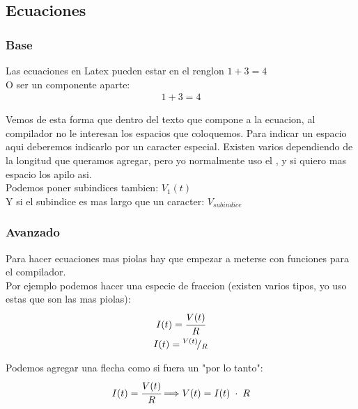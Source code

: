 \documentclass[a4paper,12pt]{article}
\newcommand*\rfrac[2]{{}^{#1}\!/_{#2}}
\begin{document}
    \newpage
    \subsection{Ecuaciones}

        \subsubsection{Base}

            Las ecuaciones en Latex pueden estar en el renglon $1 + 3 = 4$ \\
            O ser un componente aparte:
            \begin{gather*}
                1 +       3 = 4
            \end{gather*}

            Vemos de esta forma que dentro del texto que compone a la ecuacion, al compilador no le interesan los espacios que coloquemos.
            Para indicar un espacio aqui deberemos indicarlo por un caracter especial. Existen varios dependiendo de la longitud que queramos
            agregar, pero yo normalmente uso el \;, y si quiero mas espacio los apilo \;\;\;\;\; asi. \\
            
            Podemos poner subindices tambien: $V_1(t)$ \\
            Y si el subindice es mas largo que un caracter: $V_{subindice}$ \\

        \subsubsection{Avanzado}

            Para hacer ecuaciones mas piolas hay que empezar a meterse con funciones para el compilador. \\
            Por ejemplo podemos hacer una especie de fraccion (existen varios tipos, yo uso estas que son las mas piolas):
            \begin{gather*}
                I(t) = \cfrac{V(t)}{R} \\
                I(t) = \rfrac{V(t)}{R}
            \end{gather*}
            
            Podemos agregar una flecha como si fuera un "por lo tanto":
            \begin{gather*}
                I(t) = \cfrac{V(t)}{R}
                \Longrightarrow
                V(t) = I(t) \; \cdot \; R   %
            \end{gather*}
\end{document}
